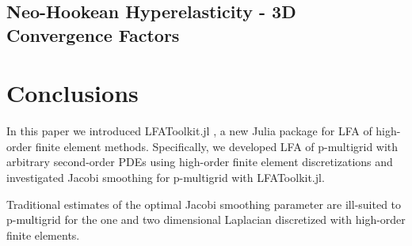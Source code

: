\documentclass[review]{siamart190516}
\begin{document}
\subsection{Neo-Hookean Hyperelasticity - 3D Convergence Factors}\label{sec:3dresults}

\section{Conclusions}\label{sec:conclusion}

In this paper we introduced LFAToolkit.jl \cite{thompson2021toolkit}, a new Julia package for LFA of high-order finite element methods.
Specifically, we developed LFA of p-multigrid with arbitrary second-order PDEs using high-order finite element discretizations and investigated Jacobi smoothing for p-multigrid with LFAToolkit.jl.

Traditional estimates of the optimal Jacobi smoothing parameter are ill-suited to p-multigrid for the one and two dimensional Laplacian discretized with high-order finite elements.



\end{document}

